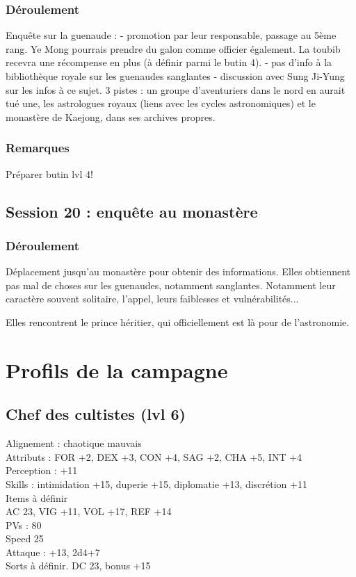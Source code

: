 \documentclass[10pt,a4paper]{book}
\begin{document}
\subsection{Déroulement}
Enquête sur la guenaude :
- promotion par leur responsable, passage au 5ème rang. Ye Mong pourrais prendre du galon comme officier également. La toubib recevra une récompense en plus (à définir parmi le butin 4).
- pas d'info à la bibliothèque royale sur les guenaudes sanglantes
- discussion avec Sung Ji-Yung sur les infos à ce sujet. 3 pistes : un groupe d'aventuriers dans le nord en aurait tué une, les astrologues royaux (liens avec les cycles astronomiques) et le monastère de Kaejong, dans ses archives propres.

\subsection{Remarques}
Préparer butin lvl 4!
\section{Session 20 : enquête au monastère}
\subsection{Déroulement}
Déplacement jusqu'au monastère pour obtenir des informations. Elles obtiennent pas mal de choses sur les guenaudes, notamment sanglantes. Notamment leur caractère souvent solitaire, l'appel, leurs faiblesses et vulnérabilités...

Elles rencontrent le prince héritier, qui officiellement est là pour de l'astronomie.
\chapter{Profils de la campagne}

\section{Chef des cultistes (lvl 6)}
Alignement : chaotique mauvais \\
Attributs : FOR +2, DEX +3, CON +4, SAG +2, CHA +5, INT +4\\
Perception : +11\\
Skills : intimidation +15, duperie +15, diplomatie +13, discrétion +11\\
Items à définir\\
AC 23, VIG +11, VOL +17, REF +14\\
PVs : 80\\
Speed 25\\
Attaque : +13, 2d4+7\\
Sorts à définir. DC 23, bonus +15
\end{document}
